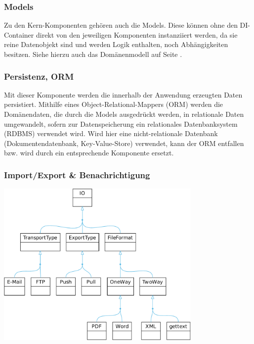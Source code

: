 \subsubsection{Models}

Zu den Kern-Komponenten gehören auch die Models. Diese können ohne den DI-Container direkt von den jeweiligen Komponenten instanziiert werden, da sie reine Datenobjekt sind und werden Logik enthalten, noch Abhängigkeiten besitzen. Siehe hierzu auch das Domänenmodell auf Seite \pageref{l:domänenmodell}.

\subsubsection{Persistenz, ORM}

Mit dieser Komponente werden die innerhalb der Anwendung erzeugten Daten persistiert. Mithilfe eines Object-Relational-Mappers (ORM) werden die Domänendaten, die durch die Models ausgedrückt werden, in relationale Daten umgewandelt, sofern zur Datenspeicherung ein relationales Datenbanksystem (RDBMS) verwendet wird. Wird hier eine nicht-relationale Datenbank (Dokumentendatenbank, Key-Value-Store) verwendet, kann der ORM entfallen bzw. wird durch ein entsprechende Komponente ersetzt.

\subsubsection{Import/Export \& Benachrichtigung}

\begin{center}
\includegraphics[width=0.75\textwidth]{media/io.pdf}
\label{chart:io}
\end{center}

